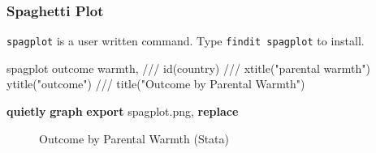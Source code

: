 \documentclass[
  letterpaper,
  DIV=11,
  numbers=noendperiod]{scrreprt}
\newenvironment{Shaded}{\begin{snugshade}}{\end{snugshade}}
\newcommand{\BaseNTok}[1]{\textcolor[rgb]{0.68,0.00,0.00}{#1}}
\newcommand{\CommentTok}[1]{\textcolor[rgb]{0.37,0.37,0.37}{#1}}
\newcommand{\KeywordTok}[1]{\textcolor[rgb]{0.00,0.23,0.31}{\textbf{#1}}}
\newcommand{\NormalTok}[1]{\textcolor[rgb]{0.00,0.23,0.31}{#1}}
\newcommand{\StringTok}[1]{\textcolor[rgb]{0.13,0.47,0.30}{#1}}
\begin{document}
\subsubsection{Spaghetti Plot}\label{spaghetti-plot}

\begin{tcolorbox}[enhanced jigsaw, colback=white, left=2mm, toprule=.15mm, arc=.35mm, colbacktitle=quarto-callout-tip-color!10!white, title=\textcolor{quarto-callout-tip-color}{\faLightbulb}\hspace{0.5em}{Installing \texttt{spagplot}}, bottomtitle=1mm, opacitybacktitle=0.6, bottomrule=.15mm, breakable, leftrule=.75mm, colframe=quarto-callout-tip-color-frame, toptitle=1mm, titlerule=0mm, coltitle=black, opacityback=0, rightrule=.15mm]

\texttt{spagplot} is a user written command. Type
\texttt{findit\ spagplot} to install.

\end{tcolorbox}

\begin{Shaded}
\begin{Highlighting}[]
\NormalTok{spagplot outcome warmth, }\CommentTok{///}
\NormalTok{  id(country) }\CommentTok{///}
  \BaseNTok{xtitle}\NormalTok{(}\StringTok{"parental warmth"}\NormalTok{) }\BaseNTok{ytitle}\NormalTok{(}\StringTok{"outcome"}\NormalTok{) }\CommentTok{///}
  \BaseNTok{title}\NormalTok{(}\StringTok{"Outcome by Parental Warmth"}\NormalTok{) }

\KeywordTok{quietly} \KeywordTok{graph} \KeywordTok{export}\NormalTok{ spagplot.png, }\KeywordTok{replace}
\end{Highlighting}
\end{Shaded}

\begin{figure}


\caption{\label{fig-Stataspagplot}Outcome by Parental Warmth (Stata)}

\end{figure}%
\end{document}
